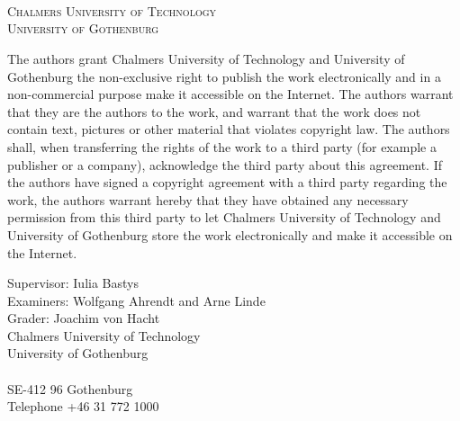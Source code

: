 \newpage
\thispagestyle{empty}
\begin{center}

    \textbf{\Large \ambaTitle} \\[1cm]

    {\linespread{1.2}\large
    \StrSubstitute{\ambaAuthors}{,}{\\}
    \\
    }

    \vfill

    \ambaDepartment \\
    \textsc{Chalmers University of Technology} \\
    \textsc{University of Gothenburg} \\
    \ambaCityCountryYear
\end{center}


\newpage
{The authors grant Chalmers University of Technology and University of Gothenburg the
    non-exclusive right to publish the work electronically and in a non-commercial purpose make it
    accessible on the Internet. The authors warrant that they are the authors to the work, and
    warrant that the work does not contain text, pictures or other material that violates
    copyright law.
    The authors shall, when transferring the rights of the work to a third party (for example a
    publisher or a company), acknowledge the third party about this agreement. If the authors have
    signed a copyright agreement with a third party regarding the work, the authors warrant
    hereby that they have obtained any necessary permission from this third party to let Chalmers
    University of Technology and University of Gothenburg store the work electronically and make
    it accessible on the Internet.}

Supervisor: Iulia Bastys \\
Examiners: Wolfgang Ahrendt and Arne Linde \\
Grader: Joachim von Hacht \\[1 cm]


Chalmers University of Technology\\
University of Gothenburg\\
\ambaDepartment \\
SE-412 96 Gothenburg\\
Telephone +46 31 772 1000 \setlength{\parskip}{0.5cm}

\vfill
\ambaCityCountryYear
